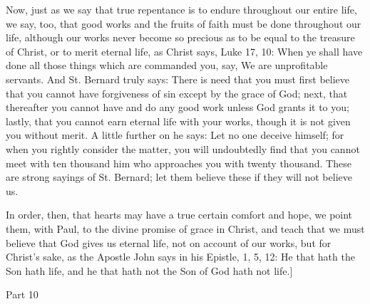 Now, just as we say that true repentance is to endure throughout our
entire life, we say, too, that good works and the fruits of faith
must be done throughout our life, although our works never become so
precious as to be equal to the treasure of Christ, or to merit
eternal life, as Christ says, Luke 17, 10: When ye shall have done
all those things which are commanded you, say, We are unprofitable
servants.  And St. Bernard truly says: There is need that you must
first believe that you cannot have forgiveness of sin except by the
grace of God; next, that thereafter you cannot have and do any good
work unless God grants it to you; lastly, that you cannot earn
eternal life with your works, though it is not given you without
merit.  A little further on he says: Let no one deceive himself; for
when you rightly consider the matter, you will undoubtedly find that
you cannot meet with ten thousand him who approaches you with twenty
thousand.  These are strong sayings of St. Bernard; let them believe
these if they will not believe us.

In order, then, that hearts may have a true certain comfort and hope,
we point them, with Paul, to the divine promise of grace in Christ,
and teach that we must believe that God gives us eternal life, not on
account of our works, but for Christ's sake, as the Apostle John says
in his Epistle, 1, 5, 12: He that hath the Son hath life, and he that
hath not the Son of God hath not life.]




Part 10


